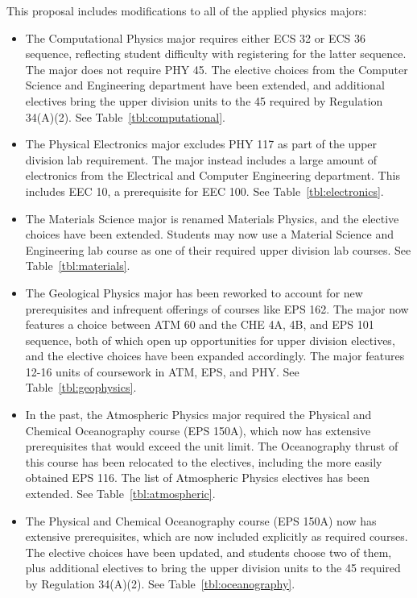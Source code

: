 \documentclass[12pt]{article}
\begin{document}
This proposal includes modifications to all of the applied physics majors:
\begin{itemize}

\item The Computational Physics major requires either ECS 32 or ECS 36
  sequence, reflecting student difficulty with registering for the
  latter sequence.  The major does not require PHY 45.  The
  elective choices from the Computer Science and Engineering
  department have been extended, and additional electives bring the
  upper division units to the 45 required by Regulation 34(A)(2).
  See Table~\ref{tbl:computational}.
  
\item The Physical Electronics major excludes PHY 117 as part of the
  upper division lab requirement.  The major instead includes a large
  amount of electronics from the Electrical and Computer Engineering
  department.  This includes EEC 10, a prerequisite for EEC 100.  See
  Table~\ref{tbl:electronics}.

\item The Materials Science major is renamed Materials Physics, and
  the elective choices have been extended.  Students may now use a
  Material Science and Engineering lab course as one of their required
  upper division lab courses.  See Table~\ref{tbl:materials}.
  
\item The Geological Physics major has been reworked to account for
  new prerequisites and infrequent offerings of courses like EPS
  162.  The major now features a choice between ATM 60 and the CHE 4A, 4B, and EPS 101 sequence,
  both of which open up opportunities for upper division electives, and
  the elective choices have been expanded accordingly.  The major
  features 12-16 units of coursework in ATM, EPS, and PHY.  See
  Table~\ref{tbl:geophysics}.
    
\item In the past, the Atmospheric Physics major required the Physical
  and Chemical Oceanography course (EPS 150A), which now has extensive
  prerequisites that would exceed the unit limit.  The Oceanography
  thrust of this course has been relocated to the electives, including
  the more easily obtained EPS 116.  The list of Atmospheric
  Physics electives has been extended.  See
  Table~\ref{tbl:atmospheric}.

\item The Physical and Chemical Oceanography course (EPS 150A) now has
  extensive prerequisites, which are now included explicitly as
  required courses.  The elective choices have been updated, and
  students choose two of them, plus additional electives to bring the
  upper division units to the 45 required by Regulation 34(A)(2).  See
  Table~\ref{tbl:oceanography}.


\end{itemize}
\end{document}
